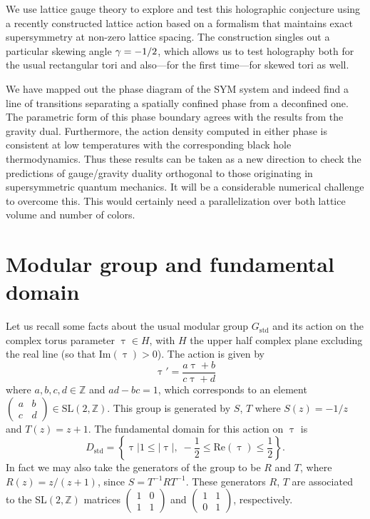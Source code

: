We use lattice gauge theory to explore and test this holographic conjecture using a recently constructed lattice action based on a formalism that maintains exact supersymmetry at non-zero lattice spacing.
The construction singles out a particular skewing angle $\gamma = -1 / 2$, which allows us to test holography both for the usual rectangular tori and also---for the first time---for skewed tori as well.

We have mapped out the phase diagram of the SYM system and indeed find a line of transitions separating a spatially confined phase from a deconfined one.
The parametric form of this phase boundary agrees with the results from the gravity dual.
Furthermore, the action density computed in either phase is consistent at low temperatures with the corresponding black hole thermodynamics.
Thus these results can be taken as a new direction to check the predictions of gauge/gravity duality orthogonal to those originating in supersymmetric quantum mechanics. It will be a 
considerable numerical challenge to overcome this. This would certainly need a parallelization over both lattice volume and number of colors. 






\section{\label{app:modular}Modular group and fundamental domain}
Let us recall some facts about the usual modular group $G_{\text{std}}$ and its action on the complex torus parameter $\uptau \in H$, with $H$ the upper half complex plane excluding the real line (so that $\mathrm{Im}(\uptau) > 0$).
The action is given by
\begin{equation}
  \uptau' = \frac{a \uptau + b}{c \uptau + d}
\end{equation}
where $a, b, c, d \in \mathbb{Z}$ and $ad - bc = 1$, which corresponds to an element $\left(\begin{array}{cc} a & b \\ c & d \end{array}\right) \in \text{SL}(2, \mathbb{Z})$.
This group is generated by $S$, $T$ where $S(z) = -1 / z$ and $T(z) = z + 1$.
The fundamental domain for this action on $\uptau$ is
\begin{equation}
  D_{\text{std}} = \left\{\uptau \big| 1 \le |\uptau|, \; - \frac{1}{2} \le \mathrm{Re}(\uptau) \le \frac{1}{2} \right\}.
\end{equation}
In fact we may also take the generators of the group to be $R$ and $T$, where $R(z) = z / (z + 1)$, since $S = T^{-1} R T^{-1}$.
These generators $R$, $T$ are associated to the SL$(2, \mathbb{Z})$ matrices $\left(\begin{array}{cc} 1 & 0 \\ 1 & 1 \end{array}\right)$ and $\left(\begin{array}{cc} 1 & 1 \\ 0 & 1 \end{array}\right)$, respectively.

